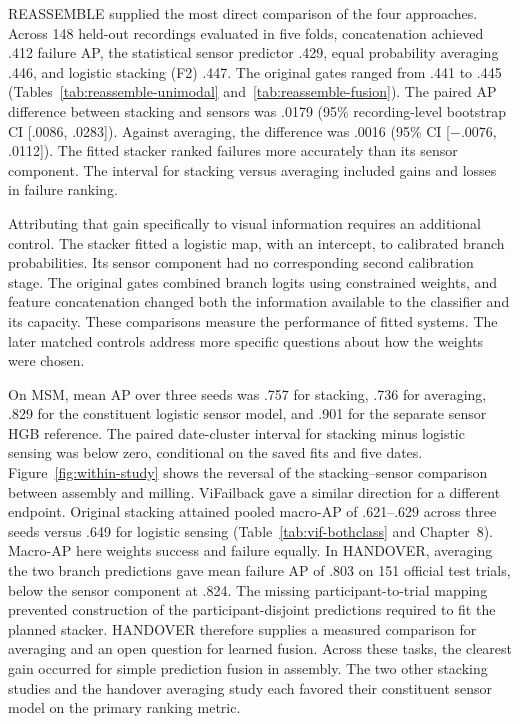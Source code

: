 REASSEMBLE supplied the most direct comparison of the four approaches. Across 148 held-out recordings evaluated in five folds, concatenation achieved .412 failure AP, the statistical sensor predictor .429, equal probability averaging .446, and logistic stacking (F2) .447. The original gates ranged from .441 to .445 (Tables~\ref{tab:reassemble-unimodal} and~\ref{tab:reassemble-fusion}). The paired AP difference between stacking and sensors was .0179 (95\% recording-level bootstrap CI [.0086, .0283]). Against averaging, the difference was .0016 (95\% CI [$-.0076$, .0112]). The fitted stacker ranked failures more accurately than its sensor component. The interval for stacking versus averaging included gains and losses in failure ranking.

Attributing that gain specifically to visual information requires an additional control. The stacker fitted a logistic map, with an intercept, to calibrated branch probabilities. Its sensor component had no corresponding second calibration stage. The original gates combined branch logits using constrained weights, and feature concatenation changed both the information available to the classifier and its capacity. These comparisons measure the performance of fitted systems. The later matched controls address more specific questions about how the weights were chosen.

On MSM, mean AP over three seeds was .757 for stacking, .736 for averaging, .829 for the constituent logistic sensor model, and .901 for the separate sensor HGB reference. The paired date-cluster interval for stacking minus logistic sensing was below zero, conditional on the saved fits and five dates. Figure~\ref{fig:within-study} shows the reversal of the stacking--sensor comparison between assembly and milling. ViFailback gave a similar direction for a different endpoint. Original stacking attained pooled macro-AP of .621--.629 across three seeds versus .649 for logistic sensing (Table~\ref{tab:vif-bothclass} and Chapter~8). Macro-AP here weights success and failure equally. In HANDOVER, averaging the two branch predictions gave mean failure AP of .803 on 151 official test trials, below the sensor component at .824. The missing participant-to-trial mapping prevented construction of the participant-disjoint predictions required to fit the planned stacker. HANDOVER therefore supplies a measured comparison for averaging and an open question for learned fusion. Across these tasks, the clearest gain occurred for simple prediction fusion in assembly. The two other stacking studies and the handover averaging study each favored their constituent sensor model on the primary ranking metric.

